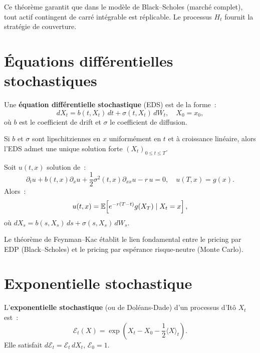 \begin{remarque}
Ce th\'eor\`eme garantit que dans le mod\`ele de Black--Scholes
(march\'e complet), tout actif contingent de carr\'e int\'egrable
est r\'eplicable. Le processus $H_t$ fournit la strat\'egie de couverture.
\end{remarque}

\section{\'Equations diff\'erentielles stochastiques}

\begin{definition}
Une \textbf{\'equation diff\'erentielle stochastique} (EDS) est de la forme~:
\[
    dX_t = b(t, X_t)\,dt + \sigma(t, X_t)\,dW_t, \quad X_0 = x_0,
\]
o\`u $b$ est le coefficient de drift et $\sigma$ le coefficient de diffusion.
\end{definition}

\begin{theoreme}
Si $b$ et $\sigma$ sont lipschitziennes en $x$ uniform\'ement en $t$
et \`a croissance lin\'eaire, alors l'EDS admet une unique solution
forte $(X_t)_{0 \leq t \leq T}$.
\end{theoreme}

\begin{theoreme}
\label{thm:feynman_kac}
Soit $u(t,x)$ solution de~:
\[
    \partial_t u + b(t,x)\partial_x u
    + \frac{1}{2}\sigma^2(t,x)\partial_{xx}u - r\,u = 0,
    \quad u(T,x) = g(x).
\]
Alors~:
\[
    u(t,x) = \mathbb{E}\!\left[e^{-r(T-t)}g(X_T) \mid X_t = x\right],
\]
o\`u $dX_s = b(s,X_s)\,ds + \sigma(s,X_s)\,dW_s$.
\end{theoreme}

\begin{remarque}
Le th\'eor\`eme de Feynman--Kac \'etablit le lien fondamental entre le
pricing par EDP (Black--Scholes) et le pricing par esp\'erance
risque-neutre (Monte Carlo).
\end{remarque}

\section{Exponentielle stochastique}

\begin{definition}
L'\textbf{exponentielle stochastique} (ou de Dol\'eans-Dade) d'un
processus d'It\^o $X_t$ est~:
\[
    \mathcal{E}_t(X) = \exp\!\left(X_t - X_0 - \frac{1}{2}\langle X\rangle_t\right).
\]
Elle satisfait $d\mathcal{E}_t = \mathcal{E}_t\,dX_t$,
$\mathcal{E}_0 = 1$.
\end{definition}

